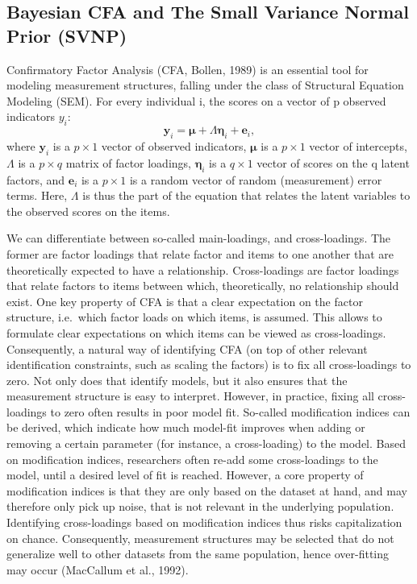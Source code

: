 \documentclass[
  man, donotrepeattitle,floatsintext]{apa6}
\begin{document}
\hypertarget{bayesian-cfa-and-the-small-variance-normal-prior-svnp}{%
\subsection{Bayesian CFA and The Small Variance Normal Prior (SVNP)}\label{bayesian-cfa-and-the-small-variance-normal-prior-svnp}}

Confirmatory Factor Analysis (CFA, Bollen, 1989) is an essential tool for modeling measurement structures, falling under the class of Structural Equation Modeling (SEM). For every individual i, the scores on a vector of p observed indicators \(y_i\):
\[\boldsymbol{y}_i = \boldsymbol{\mu} + \Lambda \boldsymbol{\eta}_i + \boldsymbol{e}_i ,\]
where \(\boldsymbol{y}_i\) is a \(p \times 1\) vector of observed indicators, \(\boldsymbol{\mu}\) is a \(p \times 1\) vector of intercepts, \(\Lambda\) is a \(p \times q\) matrix of factor loadings, \(\boldsymbol{\eta}_i\) is a \(q \times 1\) vector of scores on the q latent factors, and \(\boldsymbol{e}_i\) is a \(p \times 1\) is a random vector of random (measurement) error terms. Here, \(\Lambda\) is thus the part of the equation that relates the latent variables to the observed scores on the items.

We can differentiate between so-called main-loadings, and cross-loadings. The former are factor loadings that relate factor and items to one another that are theoretically expected to have a relationship. Cross-loadings are factor loadings that relate factors to items between which, theoretically, no relationship should exist. One key property of CFA is that a clear expectation on the factor structure, i.e.~which factor loads on which items, is assumed. This allows to formulate clear expectations on which items can be viewed as cross-loadings. Consequently, a natural way of identifying CFA (on top of other relevant identification constraints, such as scaling the factors) is to fix all cross-loadings to zero. Not only does that identify models, but it also ensures that the measurement structure is easy to interpret. However, in practice, fixing all cross-loadings to zero often results in poor model fit. So-called modification indices can be derived, which indicate how much model-fit improves when adding or removing a certain parameter (for instance, a cross-loading) to the model. Based on modification indices, researchers often re-add some cross-loadings to the model, until a desired level of fit is reached. However, a core property of modification indices is that they are only based on the dataset at hand, and may therefore only pick up noise, that is not relevant in the underlying population. Identifying cross-loadings based on modification indices thus risks capitalization on chance. Consequently, measurement structures may be selected that do not generalize well to other datasets from the same population, hence over-fitting may occur (MacCallum et al., 1992).
\end{document}

